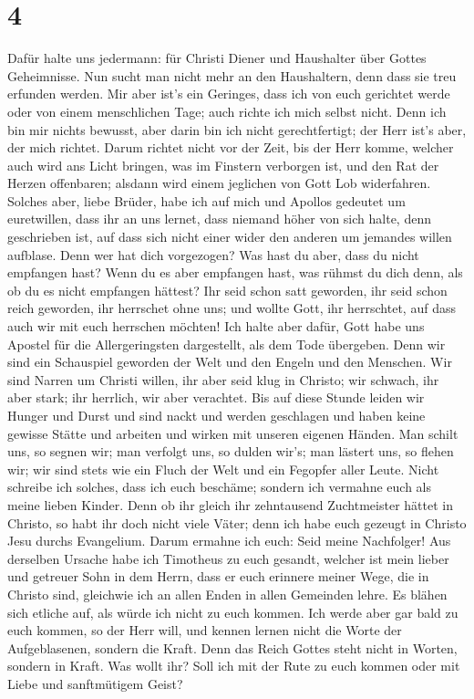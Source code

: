 \hypertarget{section-3}{%
\section{4}\label{section-3}}

 Dafür halte uns jedermann: für Christi Diener und
Haushalter über Gottes Geheimnisse.  Nun sucht man nicht
mehr an den Haushaltern, denn dass sie treu erfunden werden.
 Mir aber ist's ein Geringes, dass ich von euch gerichtet
werde oder von einem menschlichen Tage; auch richte ich mich selbst
nicht.  Denn ich bin mir nichts bewusst, aber darin bin
ich nicht gerechtfertigt; der Herr ist's aber, der mich richtet.
 Darum richtet nicht vor der Zeit, bis der Herr komme,
welcher auch wird ans Licht bringen, was im Finstern verborgen ist, und
den Rat der Herzen offenbaren; alsdann wird einem jeglichen von Gott Lob
widerfahren.  Solches aber, liebe Brüder, habe ich auf
mich und Apollos gedeutet um euretwillen, dass ihr an uns lernet, dass
niemand höher von sich halte, denn geschrieben ist, auf dass sich nicht
einer wider den anderen um jemandes willen aufblase.  Denn
wer hat dich vorgezogen? Was hast du aber, dass du nicht empfangen hast?
Wenn du es aber empfangen hast, was rühmst du dich denn, als ob du es
nicht empfangen hättest?  Ihr seid schon satt geworden,
ihr seid schon reich geworden, ihr herrschet ohne uns; und wollte Gott,
ihr herrschtet, auf dass auch wir mit euch herrschen möchten!
 Ich halte aber dafür, Gott habe uns Apostel für die
Allergeringsten dargestellt, als dem Tode übergeben. Denn wir sind ein
Schauspiel geworden der Welt und den Engeln und den Menschen.
 Wir sind Narren um Christi willen, ihr aber seid klug in
Christo; wir schwach, ihr aber stark; ihr herrlich, wir aber verachtet.
 Bis auf diese Stunde leiden wir Hunger und Durst und
sind nackt und werden geschlagen und haben keine gewisse Stätte
 und arbeiten und wirken mit unseren eigenen Händen. Man
schilt uns, so segnen wir; man verfolgt uns, so dulden wir's; man
lästert uns, so flehen wir;  wir sind stets wie ein Fluch
der Welt und ein Fegopfer aller Leute.  Nicht schreibe
ich solches, dass ich euch beschäme; sondern ich vermahne euch als meine
lieben Kinder.  Denn ob ihr gleich ihr zehntausend
Zuchtmeister hättet in Christo, so habt ihr doch nicht viele Väter; denn
ich habe euch gezeugt in Christo Jesu durchs Evangelium. 
Darum ermahne ich euch: Seid meine Nachfolger!  Aus
derselben Ursache habe ich Timotheus zu euch gesandt, welcher ist mein
lieber und getreuer Sohn in dem Herrn, dass er euch erinnere meiner
Wege, die in Christo sind, gleichwie ich an allen Enden in allen
Gemeinden lehre.  Es blähen sich etliche auf, als würde
ich nicht zu euch kommen.  Ich werde aber gar bald zu
euch kommen, so der Herr will, und kennen lernen nicht die Worte der
Aufgeblasenen, sondern die Kraft.  Denn das Reich Gottes
steht nicht in Worten, sondern in Kraft.  Was wollt ihr?
Soll ich mit der Rute zu euch kommen oder mit Liebe und sanftmütigem
Geist?

